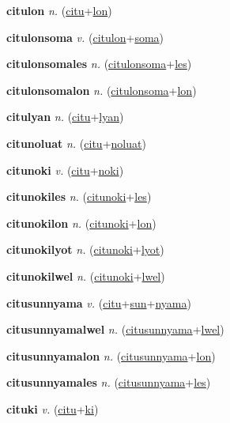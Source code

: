 \textbf{\hypertarget{citulon}{citulon}} \textit{n.} (\hyperlink{citu}{citu}+\allowbreak \hyperlink{lon}{lon})


\textbf{\hypertarget{citulonsoma}{citulonsoma}} \textit{v.} (\hyperlink{citulon}{citulon}+\allowbreak \hyperlink{soma}{soma})


\textbf{\hypertarget{citulonsomales}{citulonsomales}} \textit{n.} (\hyperlink{citulonsoma}{citulonsoma}+\allowbreak \hyperlink{les}{les})


\textbf{\hypertarget{citulonsomalon}{citulonsomalon}} \textit{n.} (\hyperlink{citulonsoma}{citulonsoma}+\allowbreak \hyperlink{lon}{lon})


\textbf{\hypertarget{citulyan}{citulyan}} \textit{n.} (\hyperlink{citu}{citu}+\allowbreak \hyperlink{lyan}{lyan})


\textbf{\hypertarget{citunoluat}{citunoluat}} \textit{n.} (\hyperlink{citu}{citu}+\allowbreak \hyperlink{noluat}{noluat})


\textbf{\hypertarget{citunoki}{citunoki}} \textit{v.} (\hyperlink{citu}{citu}+\allowbreak \hyperlink{noki}{noki})


\textbf{\hypertarget{citunokiles}{citunokiles}} \textit{n.} (\hyperlink{citunoki}{citunoki}+\allowbreak \hyperlink{les}{les})


\textbf{\hypertarget{citunokilon}{citunokilon}} \textit{n.} (\hyperlink{citunoki}{citunoki}+\allowbreak \hyperlink{lon}{lon})


\textbf{\hypertarget{citunokilyot}{citunokilyot}} \textit{n.} (\hyperlink{citunoki}{citunoki}+\allowbreak \hyperlink{lyot}{lyot})


\textbf{\hypertarget{citunokilwel}{citunokilwel}} \textit{n.} (\hyperlink{citunoki}{citunoki}+\allowbreak \hyperlink{lwel}{lwel})


\textbf{\hypertarget{citusunnyama}{citusunnyama}} \textit{v.} (\hyperlink{citu}{citu}+\allowbreak \hyperlink{sun}{sun}+\allowbreak \hyperlink{nyama}{nyama})


\textbf{\hypertarget{citusunnyamalwel}{citusunnyamalwel}} \textit{n.} (\hyperlink{citusunnyama}{citusunnyama}+\allowbreak \hyperlink{lwel}{lwel})


\textbf{\hypertarget{citusunnyamalon}{citusunnyamalon}} \textit{n.} (\hyperlink{citusunnyama}{citusunnyama}+\allowbreak \hyperlink{lon}{lon})


\textbf{\hypertarget{citusunnyamales}{citusunnyamales}} \textit{n.} (\hyperlink{citusunnyama}{citusunnyama}+\allowbreak \hyperlink{les}{les})


\textbf{\hypertarget{cituki}{cituki}} \textit{v.} (\hyperlink{citu}{citu}+\allowbreak \hyperlink{ki}{ki})


